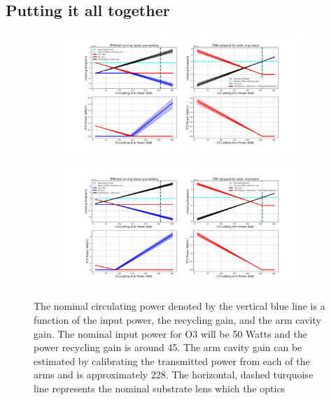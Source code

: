 	\subsection{Putting it all together}
	
	\begin{figure}[ht]
		\centering
		\begin{subfigure}[b]{1.0\textwidth}
			\centering
			\includegraphics[width=\textwidth]{../Figures/ITMX_TCS_Settings.png}
			\label{fig:TCS_ITMX}
		\end{subfigure}
		\hfill
		\begin{subfigure}[b]{1.0\textwidth}
			\centering
			\includegraphics[width=\textwidth]{../Figures/ITMY_TCS_Settings.png}
			\label{fig:TCS_ITMY}
		\end{subfigure}
		\caption{The nominal circulating power denoted by the vertical blue line is a function of the input power, the recycling gain, and the arm cavity gain.  The nominal input power for O3 will be 50 Watts and the power recycling gain is around 45.  The arm cavity gain can be estimated by calibrating the transmitted power from each of the arms and is approximately 228.  The horizontal, dashed turquoise line represents the nominal substrate lens which the optics  }
		\label{fig:TCS_ITMs}
	\end{figure}
	
